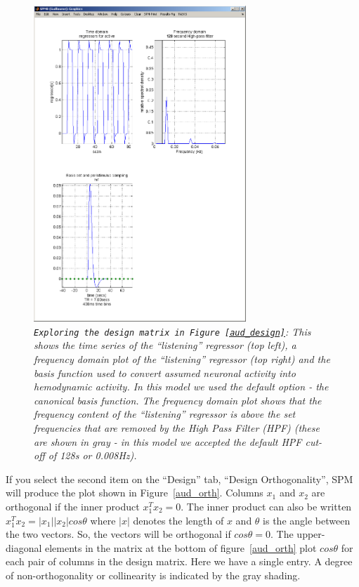 \begin{figure}
\begin{center}
\includegraphics[width=80mm]{auditory/explore}
\caption{\emph{\texttt{Exploring the design matrix in Figure~\ref{aud_design}}: This shows the time series of the ``listening'' regressor (top left), a frequency domain plot of the ``listening'' regressor (top right) and the basis function used to convert assumed neuronal activity into hemodynamic activity. In this model we used the default option - the canonical basis function. The frequency domain plot shows that the frequency content of the ``listening'' regressor is above the set frequencies that are removed by the High Pass Filter (HPF) (these are shown in gray - in this model we accepted the default HPF cut-off of 128s or 0.008Hz). \label{aud_explore}}}
\end{center}
\end{figure}

If you select the second item on the ``Design'' tab, ``Design Orthogonality'', SPM will produce the plot shown in Figure~\ref{aud_orth}. Columns $x_1$ and $x_2$ are orthogonal if the inner product $x_1^T x_2=0$. The inner product can also be written $x_1^T x_2 = |x_1||x_2| cos \theta$ where $|x|$ denotes the length of $x$ and $\theta$ is the angle between the two vectors. So, the vectors will be orthogonal if $cos \theta=0$. The upper-diagonal elements in the matrix at the bottom of figure~\ref{aud_orth} plot $cos\theta$ for each pair of columns in the design matrix. Here we have a single entry.  A degree of non-orthogonality or collinearity is indicated by the gray shading.

